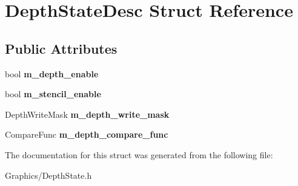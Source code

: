 \hypertarget{structDepthStateDesc}{}\section{Depth\+State\+Desc Struct Reference}
\label{structDepthStateDesc}
\subsection*{Public Attributes}
\begin{DoxyCompactItemize}
\item 
\mbox{\label{structDepthStateDesc_a46b252e70062b4dcfc1e2296ebc0eaed}} 
bool {\bfseries m\+\_\+depth\+\_\+enable}
\item 
\mbox{\label{structDepthStateDesc_ac39ccedcae567b8bfb7a740177eff612}} 
bool {\bfseries m\+\_\+stencil\+\_\+enable}
\item 
\mbox{\label{structDepthStateDesc_a2828146f8294da1775630a8c74915a91}} 
Depth\+Write\+Mask {\bfseries m\+\_\+depth\+\_\+write\+\_\+mask}
\item 
\mbox{\label{structDepthStateDesc_ae84dab709496b00cc174b9c1165befa9}} 
Compare\+Func {\bfseries m\+\_\+depth\+\_\+compare\+\_\+func}
\end{DoxyCompactItemize}


The documentation for this struct was generated from the following file\+:\begin{DoxyCompactItemize}
\item 
Graphics/Depth\+State.\+h\end{DoxyCompactItemize}
